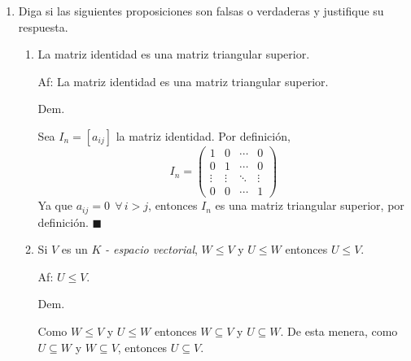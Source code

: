 \documentclass[fleqn]{article}
\begin{document}
    \begin{enumerate}
        \item Diga si las siguientes proposiciones son falsas o verdaderas y justifique su respuesta.
    
        \begin{enumerate}
            \item La matriz identidad es una matriz triangular superior. \par
            
            Af: La matriz identidad es una matriz triangular superior. \par

            \hspace{2.7mm} Dem. \par

            Sea $ I_n = [a_{ij}] $ la matriz identidad. Por definición, 
            \begin{equation*}
                I_n = 
                \begin{pmatrix}
                    1      & 0      & \cdots & 0\\ 
                    0      & 1      & \cdots & 0\\
                    \vdots & \vdots & \ddots & \vdots\\
                    0      & 0      & \cdots & 1
                \end{pmatrix}
            \end{equation*}
            Ya que $ a_{ij} = 0 \;\, \forall \, i > j $, entonces $ I_n $ es una matriz triangular superior, por definición. $ \blacksquare $ \par

            \item Si $ V $ es un $ K $ \textsl{- espacio vectorial}, $ W \leq V $ y $ U \leq W $ entonces $ U \leq V $. \par
            
            Af: $ U \leq V $. \par

            \hspace{2.7mm} Dem. \par

            Como $ W \leq V $ y $ U \leq W $ entonces $ W \subseteq V $ y $ U \subseteq W $. De esta menera, como $ U \subseteq W $ y $ W \subseteq V $, entonces $ U \subseteq V $. \par


\end{enumerate}
\end{enumerate}
\end{document}
